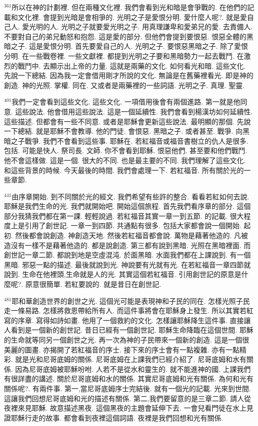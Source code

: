 \documentclass{book}
\begin{document}
$^{361}$所以在神的計劃裡.
但在兩種文化裡.
我們會看到光和暗是會爭戰的.
在他們的記載和文化裡.
會提到光暗是會相爭的.
光明之子是愛恨分明.
愛什麼人呢?.
就是愛自己人.
愛光明的人.
光明之子就要愛光明之子.
用真理謙卑和愛弟兄的愛.
去責備人.
不要對自己的弟兄動怒和抱怨.
這是愛的部分.
但他們會提到要恨惡.
恨惡全體的黑暗之子.
這是愛恨分明.
首先要愛自己的人.
光明之子.
要恨惡黑暗之子.
除了愛恨分明.
在一些戰卷裡.
一些文獻裡.
都提到光明之子要和黑暗勢力一起去戰鬥.
在激烈的戰鬥中.
去顯示出上帝的力量.
這就是兩藥的文化.
如何看光和暗.
這些文化.
先說一下總結.
因為我一定會借用剛才所說的文化.
無論是在舊藥裡看光.
即是神的創造.
神的光照.
掌權.
同在.
又或者是兩藥裡的一些詞語.
光明之子.
真理.
聖靈.

$^{401}$我們一定會看到這些文化.
這些文化.
一項借用後會有兩個進路.
第一就是他同意.
這些說法.
他會借用這些說法.
這是一個延續性.
我們會看到楊漢坊如何延續性.
這些描述.
但都會有一些不同意.
或者是耶穌會更新這些說法.
最明顯的那個.
先說一下總結.
就是耶穌不會教導.
他的門徒.
會恨惡.
黑暗之子.
或者甚至.
戰爭.
向黑暗之子戰爭.
我們不會看到這些事.
耶穌在.
若紅福音或福音書樹立的仇人是很多.
包括.
可能是快人.
祭司長.
文師.
你不會看到耶穌.
恨惡他們.
甚至要和他們戰鬥.
他不會這樣做.
這是一個.
很大的不同.
也是最主要的不同.
我們理解了這些文化.
和這些背景的時候.
今天最後的時間.
我們會處理一下.
若紅福音.
所有關於光的一些章節.

$^{441}$由序章開始.
到不同關於光的經文.
我們希望有些許的整合.
看看若紅如何去說.
耶穌是我們生命的光.
我們就開始吧.
開始這個旅程.
首先我們看序章的部分.
這個部分我猜我們都在第一課.
輕輕說過.
若紅福音其實一章一到五節.
的記載.
很大程度上是引用了創世記.
一章一到四節.
共通點有很多.
包括大家都會說一個開始.
起初.
然後都會說創造.
神創造天地.
然後若紅福音都會說.
萬物是藉著他造的.
凡被造沒有一樣不是藉著他造的.
都是說創造.
第三都有說到黑暗.
光照在黑暗裡面.
而創世記一章二節.
都說到地是空虛混沌.
於面黑暗.
水面我們都在上課說到.
有一個黑暗.
邪惡一點的描述.
最後就說到光.
神說要有光就有光.
在若紅福音一章四節就說到.
生命在他裡頭,生命就是人的光.
其實這個若紅福音.
引用創世記的原意是什麼呢?.
原意很簡單.
若紅要說的.
就是昔日在創世記.

$^{481}$耶和華創造世界的創世之光.
這個光可能是表現神和子民的同在.
怎樣光照子民走一條易路.
怎樣將救恩帶給所有人.
而這件事將會在耶穌身上發生.
所以其實若紅寫的序章.
寫得如詩如畫.
他用了一個救約的文化.
怎樣讓耶穌降生這件事.
直接讓人看到是一個新的創世記.
昔日已經有一個創世記.
耶穌生命降臨在這個世間.
耶穌的生命就等同另一個創世之光.
再一次為神的子民帶來一個新的創造.
這是一個很美麗的圖畫.
亦揭開了若紅福音的序士.
接下來的序士會有一點複雜.
亦有一點精彩.
就是光和尼哥底姆的關係.
尼哥底姆在上課我們已經介紹了.
尼哥底姆和水有關係.
因為尼哥底姆被耶穌吩咐.
人若不是從水和靈生的.
就不能進神的國.
上課我們有很詳盡的講述.
關於尼哥底姆和水的關係.
其實尼哥底姆和光有關係.
為何和光有關係呢?.
有兩件事.
第一,當尼哥底姆序士完結後.
就有一個光的記載.
光來到世間.
這讓我們回想尼哥底姆和光的描述有關係.
第二,我們要留意的是三章二節.
請人從夜裡來見耶穌.
故意描述黑夜.
這個黑夜的主題會延伸下去.
一會兒看門徒在水上見證耶穌行走的故事.
都會看到夜裡這個詞語.
夜裡是我們回想和光有關係.
\end{document}
